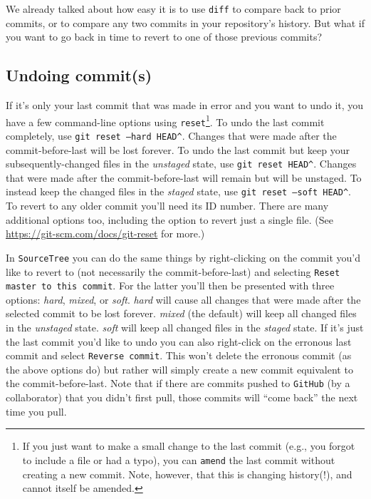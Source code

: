 \documentclass[12pt,letterpaper]{article}
\begin{document}
We already talked about how easy it is to use \texttt{diff} to compare back to prior commits, or to compare any two commits in your repository's history.
But what if you want to go back in time to revert to one of those previous commits?

\subsection{Undoing commit(s)}
If it's only your last commit that was made in error and you want to undo it, you have a few command-line options using \texttt{reset}\footnote{If you just want to make a small change to the last commit (e.g., you forgot to include a file or had a typo), you can \texttt{amend} the last commit without creating a new commit.
Note, however, that this is changing history(!), and cannot itself be amended.}.
To undo the last commit completely, use \texttt{git reset --hard HEAD\^}.
Changes that were made after the commit-before-last will be lost forever.
To undo the last commit but keep your subsequently-changed files in the \emph{unstaged} state, use \texttt{git reset HEAD\^}.
Changes that were made after the commit-before-last will remain but will be unstaged. To instead keep the changed files in the \emph{staged} state, use \texttt{git reset --soft HEAD\^}.
To revert to any older commit you'll need its ID number.
There are many additional options too, including the option to revert just a single file.
(See \url{https://git-scm.com/docs/git-reset} for more.)

In \texttt{SourceTree} you can do the same things by right-clicking on the commit you'd like to revert to (not necessarily the commit-before-last) and selecting \texttt{Reset master to this commit}.
For the latter you'll then be presented with three options: \emph{hard}, \emph{mixed}, or \emph{soft}.
\emph{hard} will cause all changes that were made after the selected commit to  be lost forever.
\emph{mixed} (the default) will keep all changed files in the \emph{unstaged} state.
\emph{soft} will keep all changed files in the \emph{staged} state.
If it's just the last commit you'd like to undo you can also right-click on the erronous last commit and select \texttt{Reverse commit}.
This won't delete the erronous commit (as the above options do) but rather will simply create a new commit equivalent to the commit-before-last.
Note that if there are commits pushed to \texttt{GitHub} (by a collaborator) that you didn't first pull, those commits will ``come back'' the next time you pull.
\end{document}
